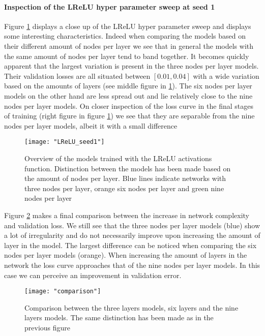 \documentclass[12pt]{article}
\begin{document}
\paragraph{Inspection of the LReLU hyper parameter sweep at seed 1}
Figure \ref{fig:LReLU} displays a close up of the LReLU hyper parameter sweep and displays some interesting characteristics. Indeed when comparing the models based on their different amount of nodes per layer we see that in general the models with the same amount of nodes per layer tend to band together. It becomes quickly apparent that the largest variation is present in the three nodes per layer models. Their validation losses are all situated between $\left[0.01, 0.04\right]$ with a wide variation based on the amounts of layers (see middle figure in \ref{fig:LReLU}). The six nodes per layer models on the other hand are less spread out and lie relatively close to the nine nodes per layer models. On closer inspection of the loss curve in the final stages of training (right figure in figure \ref{fig:LReLU}) we see that they are separable from the nine nodes per layer models, albeit it with a small difference
\begin{figure}[H]
	\hspace*{-2cm}
	\centering
	\texttt{[image: "LReLU\_seed1"]}
	\caption{Overview of the models trained with the LReLU activations function. Distinction between the models has been made based on the amount of nodes per layer. Blue lines indicate networks with three nodes per layer, orange six nodes per layer and green nine nodes per layer}
	\label{fig:LReLU}
\end{figure}
Figure \ref{fig:comparison} makes a final comparison between the increase in network complexity and validation loss. We still see that the three nodes per layer models (blue) show a lot of irregularity and do not necessarily improve upon increasing the amount of layer in the model. The largest difference can be noticed when comparing the six nodes per layer models (orange). When increasing the amount of layers in the network the loss curve approaches that of the nine nodes per layer models. In this case we can perceive an improvement in validation error. 

\begin{figure}[H]
	\hspace*{-2cm}
	\centering
	\texttt{[image: "comparison"]}
	\caption{Comparison between the three layers models, six layers and the nine layers models. The same distinction has been made as in the previous figure}
	\label{fig:comparison}
\end{figure}
\\
\end{document}
